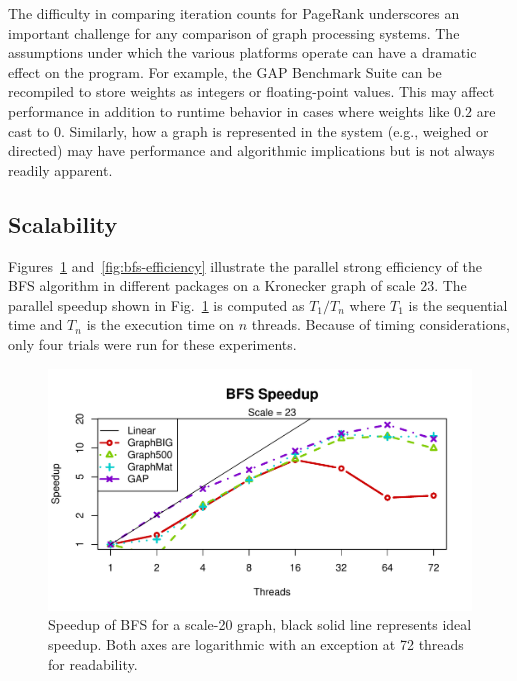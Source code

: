 \documentclass[conference]{IEEEtran}
\begin{document}
The difficulty in comparing iteration counts for PageRank underscores an important challenge for any comparison of graph processing systems. The assumptions under which the various platforms operate can have a dramatic effect on the program. For example, the GAP Benchmark Suite can be recompiled to store weights as integers or floating-point values. This may affect performance in addition to runtime behavior in cases where weights like $0.2$ are cast to $0$. Similarly, how a graph is represented in the system (e.g., weighed or directed) may have performance and algorithmic implications but is not always readily apparent.

\subsection{Scalability}
Figures~\ref{fig:bfs-speedup} and~\ref{fig:bfs-efficiency} illustrate the parallel strong efficiency of the BFS algorithm in different packages on a Kronecker graph of scale $23$. The parallel speedup shown in Fig.~\ref{fig:bfs-speedup} is computed as $T_1 / T_n$ where $T_1$ is the sequential time and $T_n$ is the execution time on $n$ threads. Because of timing considerations, only four trials were run for these experiments.
\begin{figure}[htb]
	\centering
		\includegraphics[width=\linewidth, trim=0 18pt 18pt 12pt, clip]{graphics/bfs_speedup23.pdf}
		\caption{Speedup of BFS for a scale-20 graph, black solid line represents ideal speedup. Both axes are logarithmic with an exception at 72 threads for readability. }
	\label{fig:bfs-speedup}
\end{figure}
\end{document}
